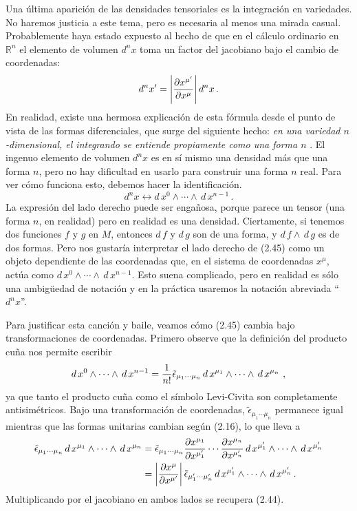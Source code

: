 \documentclass[11pt,b5paper,openany,twoside]{book}
\newcommand{\R}{\mathbb{R}}
\begin{document}
Una última aparición de las densidades tensoriales es la integración en variedades.
No haremos justicia a este tema, pero es necesaria al menos una mirada casual.
Probablemente haya estado expuesto al hecho de que en el cálculo ordinario en $\R^n$ el elemento de volumen $d^nx$ toma un factor del jacobiano bajo el cambio de coordenadas:
\begin{equation}
d^nx' = \left|{{\partial x^{\mu'}}\over{\partial x^\mu}}
\right| d^nx\,.\label{2.44}
\end{equation}
En realidad, existe una hermosa explicación de esta fórmula desde el punto de vista de las formas diferenciales, que surge del siguiente hecho: {\it en una variedad $n$-dimensional, el integrando se entiende propiamente como una forma $n$} .
El ingenuo elemento de volumen $d^nx$ es en sí mismo una densidad más que una forma $n$, pero no hay dificultad en usarlo para construir una forma $n$ real.
Para ver cómo funciona esto, debemos hacer la identificación.
\begin{equation}
d^nx \leftrightarrow  d\,x^0\wedge \cdots \wedge\, d\,x^{n-1}
\,.\label{2.45}
\end{equation}
La expresión del lado derecho puede ser engañosa, porque parece un tensor (una forma $n$, en realidad) pero en realidad es una densidad.
Ciertamente, si tenemos dos funciones $f$ y $g$ en $M$, entonces $ d\,f$ y $ d\,g$ son de una forma, y $ d\,f\wedge \, d\,g$ es de dos formas.
Pero nos gustaría interpretar el lado derecho de (2.45) como un objeto dependiente de las coordenadas que, en el sistema de coordenadas $x^\mu$, actúa como $ d\,x^0\wedge \cdots \wedge\, d\,x^{n-1}$.
Esto suena complicado, pero en realidad es sólo una ambigüedad de notación y en la práctica usaremos la notación abreviada ``$d^nx$''.

Para justificar esta canción y baile, veamos cómo (2.45) cambia bajo transformaciones de coordenadas.
Primero observe que la definición del producto cuña nos permite escribir
\begin{equation}
 d\,x^0\wedge \cdots \wedge\, d\,x^{n-1} = {1\over {n!}}
\tilde\epsilon_{\mu_1\cdots\mu_n}
\, d\,x^{\mu_1}\wedge \cdots \wedge\, d\,x^{\mu_n}\ ,\label{2.46}
\end{equation}
ya que tanto el producto cuña como el símbolo Levi-Civita son completamente antisimétricos.
Bajo una transformación de coordenadas, $\tilde\epsilon_{\mu_1\cdots\mu_n}$ permanece igual mientras que las formas unitarias cambian según (2.16), lo que lleva a
\begin{align}
\tilde\epsilon_{\mu_1\cdots\mu_n}
\, d\,x^{\mu_1}\wedge \cdots \wedge \, d\,x^{\mu_n}
&=  \tilde\epsilon_{\mu_1\cdots\mu_n}
{{\partial x^{\mu_1}}\over{\partial x^{\mu_1'}}}\cdots
{{\partial x^{\mu_n}}\over{\partial x^{\mu_n'}}}
\, d\,x^{\mu_1'}\wedge \cdots \wedge \, d\,x^{\mu_n'}\nonumber \\
&=  \left|{{\partial x^{\mu}}\over{\partial x^{\mu'}}}\right|
\tilde\epsilon_{\mu_1'\cdots\mu_n'}
\, d\,x^{\mu_1'}\wedge \cdots \wedge \, d\,x^{\mu_n'}\,. \label{2.47}
\end{align}
Multiplicando por el jacobiano en ambos lados se recupera (2.44).
\end{document}
